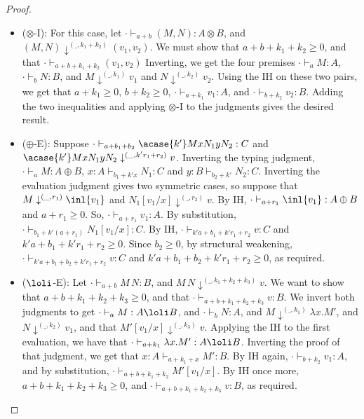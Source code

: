 \begin{proof}
\begin{itemize}
\item($\otimes$-I): For this case, let $\cdot \vdash_{a+b}(M,N) : A \otimes B$, and $(M,N) \downarrow^{(\_,k_1+k_2)} (v_1,v_2)$. We must show that $a + b + k_1 + k_2 \geq 0$, and that $\cdot \vdash_{a + b + k_1 + k_2 }(v_1,v_2)$
Inverting, we get the four premises $\cdot \vdash_a M : A$, $\cdot \vdash_b N : B$, and $M \downarrow^{(\_,k_1)}v_1$ and $N \downarrow^{(\_,k_2)} v_2$. Using the IH on these two pairs, we get that $a + k_1 \geq 0$, $b + k_2 \geq 0$, $\cdot \vdash_{a+k_1} v_1 : A$, and $\cdot \vdash_{b + k_2} v_2 : B$. Adding the two inequalities and applying $\otimes$-I to the judgments gives the desired result.


\item($\oplus$-E): Suppose $\cdot \vdash_{a+b_1+b_2} \acase {k'} M x {N_1} y {N_2} : C$ and $\acase {k'} M x {N_1} y {N_2} \downarrow^{(\_,k'r_1 + r_2)} v$. 
Inverting the typing judgment, $\cdot \vdash_a M : A \oplus B$, $x : A \vdash_{b_1 + k'x} N_1 : C$ and $y : B \vdash_{b_2 + k'} N_2 : C$. Inverting the evaluation judgment gives two symmetric cases, so suppose that $M \downarrow^{(\_,r_1)} \inl {v_1}$ and $N_1[v_1/x] \downarrow^{(\_,r_2)} v$. By IH, $\cdot \vdash_{a+r_1} \inl {v_1} : A \oplus B$ and $a + r_1 \geq 0$. So, $\cdot \vdash_{a+r_1} v_1 : A$. By substitution, $\cdot \vdash_{b_1 + k'(a+r_1)} N_1[v_1/x] : C$. By IH, $\cdot \vdash_{k'a + b_1 + k'r_1 +  r_2} v : C$ and $k'a + b_1 + k'r_1 +  r_2 \geq 0$. Since $b_2 \geq 0$, by structural weakening, $\cdot \vdash_{k'a + b_1 + b_2 + k'r_1 +  r_2} v : C$ and $k'a + b_1 + b_2 + k'r_1 +  r_2 \geq 0$, as required.

\item ($\loli$-E):  Let $\cdot \vdash_{a+b} M \, N : B$, and $M \, N \downarrow^{(\_,k_1+k_2+k_3)} v$. We want to show that $a + b + k_1 + k_2 + k_3 \geq 0$, and that $\cdot \vdash_{a + b + k_1 + k_2 + k_3} v : B$. We invert both judgments to get $\cdot \vdash_a M : A \loli B$, and $\cdot \vdash_b N : A$, and $M\downarrow^{(\_,k_1)} \lambda x.M'$, and $N \downarrow^{(\_,k_2)} v_1$, and that $M'[v_1/x] \downarrow^{(\_,k_3)} v$. Applying the IH to the first evaluation, we have that $\cdot \vdash_{a+k_1} \lambda x.M' : A \loli B$. Inverting the proof of that judgment, we get that $x : A \vdash_{a+k_1+x} M' : B$. By IH again, $\cdot \vdash_{b+k_2} v_1 : A$, and by substitution, $\cdot \vdash_{a+b+k_1+k_2} M'[v_1/x]$. By IH once more, $a + b + k_1 + k_2 + k_3 \geq 0$, and $\cdot \vdash_{a + b + k_1 + k_2 + k_3} v : B$, as required.


\end{itemize}
\end{proof}

